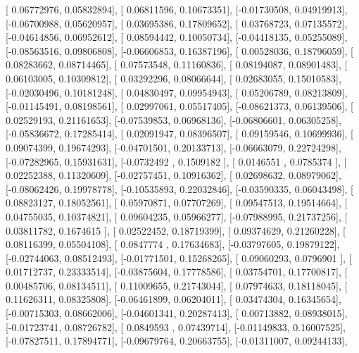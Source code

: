 \documentclass{article}
\begin{document}
       [ 0.06772976,  0.05832894],
       [ 0.06811596,  0.10673351],
       [-0.01730508,  0.04919913],
       [-0.06700988,  0.05620957],
       [ 0.03695386,  0.17809652],
       [ 0.03768723,  0.07135572],
       [-0.04614856,  0.06952612],
       [ 0.08594442,  0.10050734],
       [-0.04418135,  0.05255089],
       [-0.08563516,  0.09806808],
       [-0.06606853,  0.16387196],
       [ 0.00528036,  0.18796059],
       [ 0.08283662,  0.08714465],
       [ 0.07573548,  0.11160836],
       [ 0.08194087,  0.08901483],
       [ 0.06103005,  0.10309812],
       [ 0.03292296,  0.08066644],
       [ 0.02683055,  0.15010583],
       [-0.02030496,  0.10181248],
       [ 0.04830497,  0.09954943],
       [ 0.05206789,  0.08213809],
       [-0.01145491,  0.08198561],
       [ 0.02997061,  0.05517405],
       [-0.08621373,  0.06139506],
       [ 0.02529193,  0.21161653],
       [-0.07539853,  0.06968136],
       [-0.06806601,  0.06305258],
       [-0.05836672,  0.17285414],
       [ 0.02091947,  0.08396507],
       [ 0.09159546,  0.10699936],
       [ 0.09074399,  0.19674293],
       [-0.04701501,  0.20133713],
       [-0.06663079,  0.22724298],
       [-0.07282965,  0.15931631],
       [-0.0732492 ,  0.1509182 ],
       [ 0.0146551 ,  0.0785374 ],
       [ 0.02252388,  0.11320609],
       [-0.02757451,  0.10916362],
       [ 0.02698632,  0.08979062],
       [-0.08062426,  0.19978778],
       [-0.10535893,  0.22032846],
       [-0.03590335,  0.06043498],
       [ 0.08823127,  0.18052561],
       [ 0.05970871,  0.07707269],
       [ 0.09547513,  0.19514664],
       [ 0.04755035,  0.10374821],
       [ 0.09604235,  0.05966277],
       [-0.07988995,  0.21737256],
       [ 0.03811782,  0.1674615 ],
       [ 0.02522452,  0.18719399],
       [ 0.09374629,  0.21260228],
       [ 0.08116399,  0.05504108],
       [ 0.0847774 ,  0.17634683],
       [-0.03797605,  0.19879122],
       [-0.02744063,  0.08512493],
       [-0.01771501,  0.15268265],
       [ 0.09060293,  0.0796901 ],
       [ 0.01712737,  0.23333514],
       [-0.03875604,  0.17778586],
       [ 0.03754701,  0.17700817],
       [ 0.00485706,  0.08134511],
       [ 0.11009655,  0.21743044],
       [ 0.07974633,  0.18118045],
       [ 0.11626311,  0.08325808],
       [-0.06461899,  0.06204011],
       [ 0.03474304,  0.16345654],
       [-0.00715303,  0.08662006],
       [-0.04601341,  0.20287413],
       [ 0.00713882,  0.08938015],
       [-0.01723741,  0.08726782],
       [ 0.0849593 ,  0.07439714],
       [-0.01149833,  0.16007525],
       [-0.07827511,  0.17894771],
       [-0.09679764,  0.20663755],
       [-0.01311007,  0.09244133],
\end{document}
